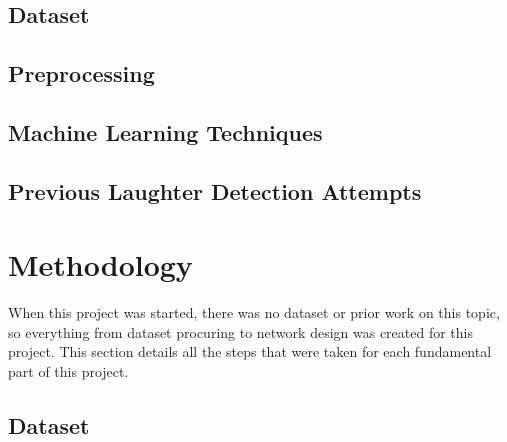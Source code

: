 \documentclass[a4paper,11pt,notitlepage]{article}
\begin{document}

\subsection{Dataset}

\subsection{Preprocessing}


\subsection{Machine Learning Techniques}

\subsection{Previous Laughter Detection Attempts}

\section{Methodology}


When this project was started, there was no dataset or prior work on this topic, so everything from dataset procuring to network design was created for this project. This section details all the steps that were taken for each fundamental part of this project.

\subsection{Dataset}

\end{document}
